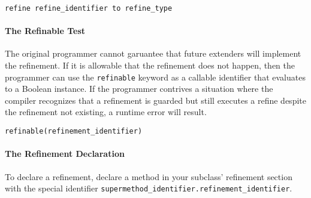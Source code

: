 \begin{lstlisting}
refine refine_identifier to refine_type
\end{lstlisting}

\paragraph{The Refinable Test}
The original programmer cannot garuantee that future extenders will implement the refinement. If it is allowable that the refinement does not happen, then the programmer can use the \verb!refinable! keyword as a callable identifier that evaluates to a Boolean instance. If the programmer contrives a situation where the compiler recognizes that a refinement is guarded but still executes a refine despite the refinement not existing, a runtime error will result.

\begin{lstlisting}
refinable(refinement_identifier)
\end{lstlisting}

\paragraph{The Refinement Declaration}
To declare a refinement, declare a method in your subclass' refinement section with the special identifier \verb!supermethod_identifier.refinement_identifier!.